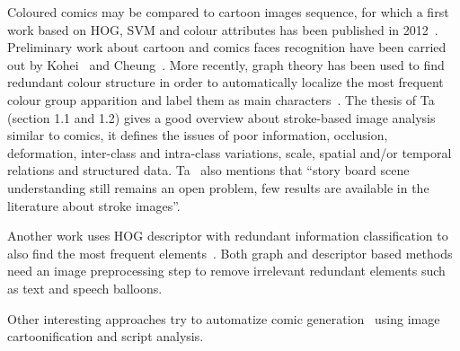 Coloured comics may be compared to cartoon images sequence, for which a first work based on HOG, SVM and colour attributes has been published in 2012~\cite{Khan12}.
Preliminary work about cartoon and comics faces recognition have been carried out by Kohei~\cite{Kohei2012} and Cheung~\cite{cheung2008face}.
More recently, graph theory has been used to find redundant colour structure in order to automatically localize the most frequent colour group apparition and label them as main characters~\cite{HoGREC2013}.
The thesis of Ta~\cite{TAPhD2010} (section 1.1 and 1.2) gives a good overview about stroke-based image analysis similar to comics, it defines the issues of poor information, occlusion, deformation, inter-class and intra-class variations, scale, spatial and/or temporal relations and structured data.
Ta~\cite{TAPhD2010} also mentions that ``story board scene understanding still remains an open problem, few results are available in the literature about stroke images''.

Another work uses HOG descriptor with redundant information classification to also find the most frequent elements~\cite{SunICDAR2013}.
Both graph and descriptor based methods need an image preprocessing step to remove irrelevant redundant elements such as text and speech balloons.

Other interesting approaches try to automatize comic generation~\cite{Tobita2010Comic,WangHYYC12} using image cartoonification and script analysis.





